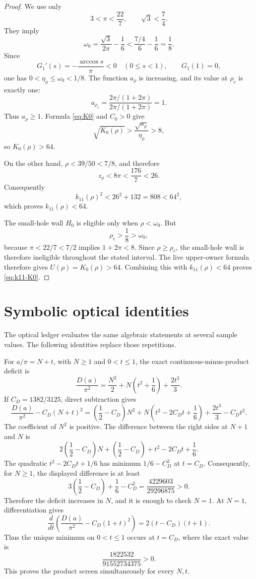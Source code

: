 \documentclass[11pt]{article}
\begin{document}
\begin{proof}
We use only
\[
       3<\pi<\frac{22}{7},
       \qquad \sqrt3<\frac74.
\]
They imply
\[
 \omega_0
 =\frac{\sqrt3}{2\pi}-\frac16
 <\frac{7/4}{6}-\frac16=\frac18.
\]
Since
\[
  G_1'(s)=-\frac{\arccos s}{\pi}<0\quad(0\leq s<1),
  \qquad G_1(1)=0,
\]
one has \(0<\eta_\rho\leq\omega_0<1/8\). The function
\(a_\rho\) is increasing, and its value at \(\rho_c\) is exactly one:
\[
 a_{\rho_c}
 =\frac{2\pi/(1+2\pi)}{2\pi/(1+2\pi)}=1.
\]
Thus \(a_\rho\geq1\). Formula \eqref{eq:K0} and \(C_0>0\) give
\[
 \sqrt{K_0(\rho)}
 >\frac{\sqrt{a_\rho}}{\eta_\rho}>8,
\]
so \(K_0(\rho)>64\).

 On the other hand, \(\rho<39/50<7/8\), and therefore
\[
 z_\rho<8\pi<\frac{176}{7}<26.
\]
Consequently
\[
 k_{11}(\rho)^2<26^2+132=808<64^2,
\]
which proves \(k_{11}(\rho)<64\).

 The small-hole wall \(H_0\) is eligible only when
\(\rho<\omega_0\). But
\[
 \rho_c>\frac18>\omega_0,
\]
 because \(\pi<22/7<7/2\) implies \(1+2\pi<8\).
 Since \(\rho\geq\rho_c\), the small-hole wall is therefore ineligible
 throughout the stated interval.  The live upper-owner formula
 therefore gives \(U(\rho)=K_0(\rho)>64\).  Combining this with
 \(k_{11}(\rho)<64\) proves \eqref{eq:k11-K0}.
\end{proof}

\section{Symbolic optical identities}

The optical ledger evaluates the same algebraic statements at several
sample values. The following identities replace those repetitions.

For \(a/\pi=N+t\), with \(N\geq1\) and \(0<t\leq1\), the exact
continuous-minus-product deficit is
\begin{equation}
 \frac{D(a)}{\pi^2}
 =\frac{N^2}{2}+N\left(t^2+\frac16\right)
  +\frac{2t^3}{3}.
 \label{eq:product-deficit}
\end{equation}
If \(C_D=1382/3125\), direct subtraction gives
\begin{equation}
 \frac{D(a)}{\pi^2}-C_D(N+t)^2
 =\left(\frac12-C_D\right)N^2
  +N\left(t^2-2C_Dt+\frac16\right)
  +\frac{2t^3}{3}-C_Dt^2.
 \label{eq:product-symbolic}
\end{equation}
The coefficient of \(N^2\) is positive. The difference between the
right sides at \(N+1\) and \(N\) is
\[
 2\left(\frac12-C_D\right)N
 +\left(\frac12-C_D\right)
 +t^2-2C_Dt+\frac16.
\]
The quadratic \(t^2-2C_Dt+1/6\) has minimum
\(1/6-C_D^2\) at \(t=C_D\).
Consequently, for \(N\geq1\), the displayed difference is at least
\[
 3\left(\frac12-C_D\right)+\frac16-C_D^2
 =\frac{4229603}{29296875}>0.
\]
Therefore the deficit increases in \(N\), and it is enough to check
\(N=1\). At \(N=1\), differentiation gives
\[
 \frac{d}{dt}\left(
 \frac{D(a)}{\pi^2}-C_D(1+t)^2
 \right)=2(t-C_D)(t+1).
\]
Thus the unique minimum on \(0<t\leq1\) occurs at \(t=C_D\), where the
exact value is
\begin{equation}
       \frac{1822532}{91552734375}>0.
       \label{eq:product-minimum}
\end{equation}
This proves the product screen simultaneously for every \(N,t\).
\end{document}
